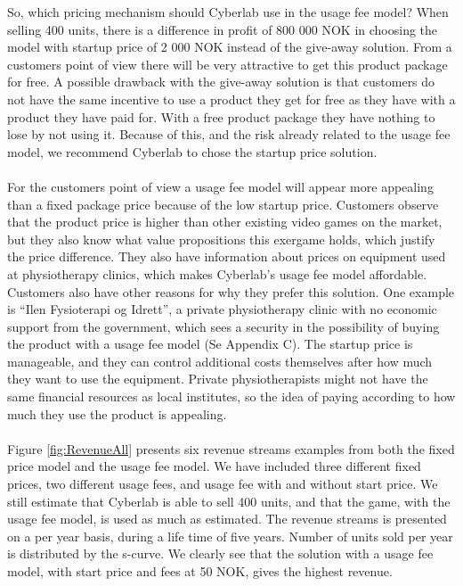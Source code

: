 So, which pricing mechanism should Cyberlab use in the usage fee model? When selling 400 units, there is a difference in profit of 800 000 NOK in choosing the model with startup price of 2 000 NOK instead of the give-away solution. From a customers point of view there will be very attractive to get this product package for free. A possible drawback with the give-away solution is that customers do not have the same incentive to use a product they get for free as they have with a product they have paid for. With a free product package they have nothing to lose by not using it. Because of this, and the risk already related to the usage fee model, we recommend Cyberlab to chose the startup price solution. \\ \\ 
For the customers point of view a usage fee model will appear more appealing than a fixed package price because of the low startup price. Customers observe that the product price is higher than other existing video games on the market, but they also know what value propositions this exergame holds, which justify the price difference. They also have information about prices on equipment used at physiotherapy clinics, which makes Cyberlab’s usage fee model affordable. Customers also have other reasons for why they prefer this solution. One example is “Ilen Fysioterapi og Idrett”, a private physiotherapy clinic with no economic support from the government, which sees a security in the possibility of buying the product with a usage fee model (Se Appendix C). The startup price is manageable, and they can control additional costs themselves after how much they want to use the equipment. Private physiotherapists might not have the same financial resources as local institutes, so the idea of paying according to how much they use the product is appealing.  \\ \\
Figure \ref{fig:RevenueAll} presents six revenue streams examples from both the fixed price model and the usage fee model. We have included three different fixed prices, two different usage fees, and usage fee with and without start price. We still estimate that Cyberlab is able to sell 400 units, and that the game, with the usage fee model, is used as much as estimated. The revenue streams is presented on a per year basis, during a life time of five years. Number of units sold per year is distributed by the s-curve. We clearly see that the solution with a usage fee model, with start price and fees at 50 NOK, gives the highest revenue.  
